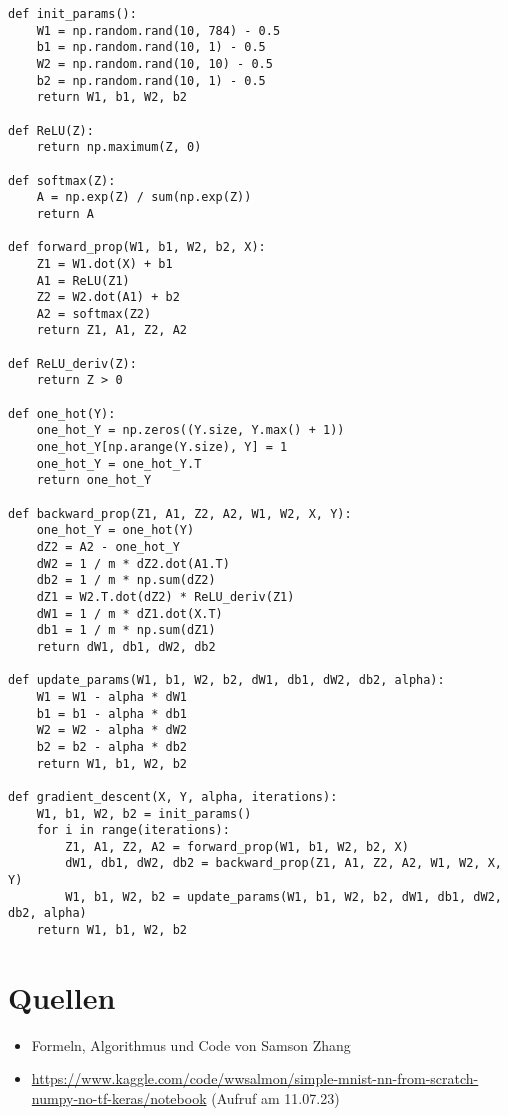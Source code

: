 \documentclass[10pt,a4paper]{article}
\begin{document}
\begin{verbatim}
def init_params():
    W1 = np.random.rand(10, 784) - 0.5
    b1 = np.random.rand(10, 1) - 0.5
    W2 = np.random.rand(10, 10) - 0.5
    b2 = np.random.rand(10, 1) - 0.5
    return W1, b1, W2, b2

def ReLU(Z):
    return np.maximum(Z, 0)

def softmax(Z):
    A = np.exp(Z) / sum(np.exp(Z))
    return A
    
def forward_prop(W1, b1, W2, b2, X):
    Z1 = W1.dot(X) + b1
    A1 = ReLU(Z1)
    Z2 = W2.dot(A1) + b2
    A2 = softmax(Z2)
    return Z1, A1, Z2, A2

def ReLU_deriv(Z):
    return Z > 0

def one_hot(Y):
    one_hot_Y = np.zeros((Y.size, Y.max() + 1))
    one_hot_Y[np.arange(Y.size), Y] = 1
    one_hot_Y = one_hot_Y.T
    return one_hot_Y

def backward_prop(Z1, A1, Z2, A2, W1, W2, X, Y):
    one_hot_Y = one_hot(Y)
    dZ2 = A2 - one_hot_Y
    dW2 = 1 / m * dZ2.dot(A1.T)
    db2 = 1 / m * np.sum(dZ2)
    dZ1 = W2.T.dot(dZ2) * ReLU_deriv(Z1)
    dW1 = 1 / m * dZ1.dot(X.T)
    db1 = 1 / m * np.sum(dZ1)
    return dW1, db1, dW2, db2

def update_params(W1, b1, W2, b2, dW1, db1, dW2, db2, alpha):
    W1 = W1 - alpha * dW1
    b1 = b1 - alpha * db1    
    W2 = W2 - alpha * dW2  
    b2 = b2 - alpha * db2    
    return W1, b1, W2, b2

def gradient_descent(X, Y, alpha, iterations):
    W1, b1, W2, b2 = init_params()
    for i in range(iterations):
        Z1, A1, Z2, A2 = forward_prop(W1, b1, W2, b2, X)
        dW1, db1, dW2, db2 = backward_prop(Z1, A1, Z2, A2, W1, W2, X, Y)
        W1, b1, W2, b2 = update_params(W1, b1, W2, b2, dW1, db1, dW2, db2, alpha)    
    return W1, b1, W2, b2
\end{verbatim}

\section*{Quellen}
\begin{itemize}
	\item Formeln, Algorithmus und Code von Samson Zhang
    \item \url{https://www.kaggle.com/code/wwsalmon/simple-mnist-nn-from-scratch-numpy-no-tf-keras/notebook} (Aufruf am 11.07.23)
\end{itemize}
\end{document}
